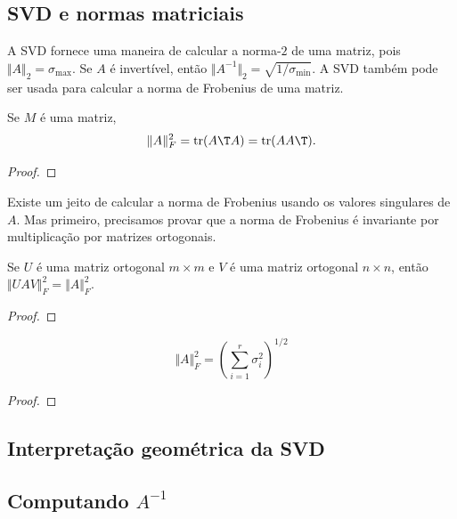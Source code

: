 \documentclass{article}
\DeclareMathOperator{\tr}{tr}
\begin{document}
\subsection{SVD e normas matriciais}

A SVD fornece uma maneira de calcular a norma-\(2\) de uma matriz, pois \(\Vert A \Vert_2 = \sigma_{\max}\). Se \(A\) é invertível, então \(\Vert A^{-1} \Vert_2 = \sqrt{1/\sigma_{\min}}\). A SVD também pode ser usada para calcular a norma de Frobenius de uma matriz.

\begin{prop}
    Se \(M\) é uma matriz,
    \begin{equation}
        \Vert A \Vert_F^2 = \tr(A\T  A) = \tr(A A\T ).
    \end{equation}
\end{prop}

\begin{proof}
    
\end{proof}

Existe um jeito de calcular a norma de Frobenius usando os valores singulares de \(A\). Mas primeiro, precisamos provar que a norma de Frobenius é invariante por multiplicação por matrizes ortogonais.

\begin{lem}
    Se \(U\) é uma matriz ortogonal \(m \times m\) e \(V\) é uma matriz ortogonal \(n \times n\), então \(\Vert UAV \Vert_F^2 = \Vert A \Vert_F^2\).
\end{lem}

\begin{proof}
    
\end{proof}

\begin{cor}
    \begin{equation}
        \Vert A \Vert_F^2 = \left(\sum_{i=1}^{r} \sigma_i^2\right)^{1/2}
    \end{equation}
\end{cor}

\begin{proof}
    
\end{proof}

\subsection{Interpretação geométrica da SVD}

\subsection{Computando \(A^{-1}\)}
\end{document}
